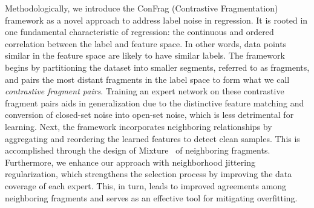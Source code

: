 \documentclass{article}
\theoremstyle{plain}
\theoremstyle{definition}
\theoremstyle{remark}
\begin{document}
Methodologically, we introduce the ConFrag (Contrastive Fragmentation) framework as a novel approach to address label noise in regression.
It is rooted in one fundamental characteristic of regression: the continuous and ordered correlation between the label and feature space. 
In other words, data points similar in the feature space are likely to have similar labels.
The framework begins by partitioning the dataset into smaller segments, referred to as fragments, and pairs the most distant fragments in the label space to form what we call \textit{contrastive fragment pairs}. 
Training an expert network on these contrastive fragment pairs aids in generalization due to the distinctive feature matching and conversion of closed-set noise into open-set noise, which is less detrimental for learning.
Next, the framework incorporates neighboring relationships by aggregating and reordering the learned features to detect clean samples. 
This is accomplished through the design of Mixture~\citep{jacobs1991MoE} of neighboring fragments.
Furthermore, we enhance our approach with neighborhood jittering regularization, which strengthens the selection process by improving the data coverage of each expert. 
This, in turn, leads to improved agreements among neighboring fragments and serves as an effective tool for mitigating overfitting.
\end{document}
